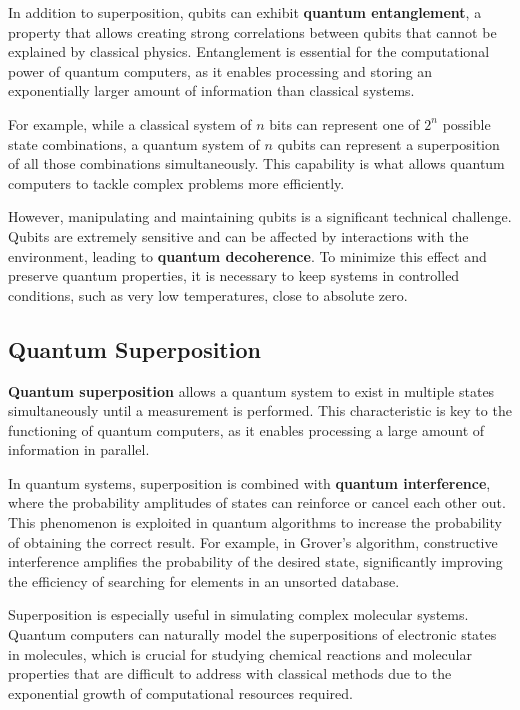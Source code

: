 In addition to superposition, qubits can exhibit \textbf{quantum entanglement}, a property that allows creating strong correlations between qubits that cannot be explained by classical physics. Entanglement is essential for the computational power of quantum computers, as it enables processing and storing an exponentially larger amount of information than classical systems.

For example, while a classical system of $n$ bits can represent one of $2^n$ possible state combinations, a quantum system of $n$ qubits can represent a superposition of all those combinations simultaneously. This capability is what allows quantum computers to tackle complex problems more efficiently.

However, manipulating and maintaining qubits is a significant technical challenge. Qubits are extremely sensitive and can be affected by interactions with the environment, leading to \textbf{quantum decoherence}. To minimize this effect and preserve quantum properties, it is necessary to keep systems in controlled conditions, such as very low temperatures, close to absolute zero.

\subsection{Quantum Superposition}

\textbf{Quantum superposition} allows a quantum system to exist in multiple states simultaneously until a measurement is performed. This characteristic is key to the functioning of quantum computers, as it enables processing a large amount of information in parallel.

In quantum systems, superposition is combined with \textbf{quantum interference}, where the probability amplitudes of states can reinforce or cancel each other out. This phenomenon is exploited in quantum algorithms to increase the probability of obtaining the correct result. For example, in Grover's algorithm, constructive interference amplifies the probability of the desired state, significantly improving the efficiency of searching for elements in an unsorted database.

Superposition is especially useful in simulating complex molecular systems. Quantum computers can naturally model the superpositions of electronic states in molecules, which is crucial for studying chemical reactions and molecular properties that are difficult to address with classical methods due to the exponential growth of computational resources required.

